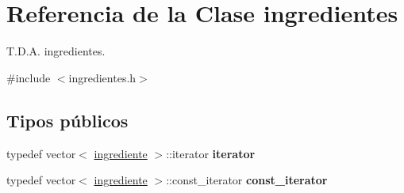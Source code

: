 \hypertarget{classingredientes}{}\section{Referencia de la Clase ingredientes}
\label{classingredientes}


T.\+D.\+A. ingredientes.  




{\ttfamily \#include $<$ingredientes.\+h$>$}

\subsection*{Tipos públicos}
\begin{DoxyCompactItemize}
\item 
\mbox{\label{classingredientes_af0cadce160cefe5482ca7d55ef86c893}} 
typedef vector$<$ \hyperlink{classingrediente}{ingrediente} $>$\+::iterator {\bfseries iterator}
\item 
\mbox{\label{classingredientes_ac84040efbb789929ebe9177605bb890a}} 
typedef vector$<$ \hyperlink{classingrediente}{ingrediente} $>$\+::const\+\_\+iterator {\bfseries const\+\_\+iterator}
\end{DoxyCompactItemize}
